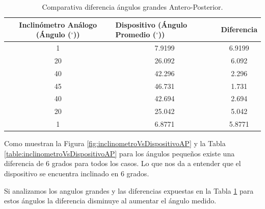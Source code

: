 \documentclass[12pt,a4paper]{article}
\newcommand{\grad}{$^{\circ}$}
\begin{document}
\begin{table}[H]
	\centering
	\caption{Comparativa diferencia ángulos grandes Antero-Posterior.}
	\begin{tabular}{|c|c|c|}
		\hline
		\textbf{Inclinómetro Análogo (Ángulo (\grad))} & \multicolumn{1}{l|}{\textbf{Dispositivo (Ángulo Promedio (\grad))}} & Diferencia 				\\ \hline
		1                                      & 7.9199                                                      & 6.9199                     \\ \hline
		20                                      & 26.092                                                      & 6.092                    \\ \hline
		40                                      & 42.296                                                      & 2.296                     \\ \hline
		45                                      & 46.731                                                      & 1.731                     \\ \hline
		40                                      & 42.694                                                      & 2.694                      \\ \hline
		20                                      & 25.042                                                      & 5.042                     \\ \hline
		1                                      & 6.8771                                                      & 5.8771                     \\ \hline
	\end{tabular}	
	\label{table:inclinometroVsDispositivoAPD}
\end{table}

Como muestran la Figura \ref{fig:inclinometroVsDispositivoAP} y la Tabla \ref{table:inclinometroVsDispositivoAP} para los ángulos pequeños existe una diferencia de 6 grados para todos los casos.
Lo que nos da a entender que el dispositivo se encuentra inclinado en 6 grados.

Si analizamos los angulos grandes y las diferencias expuestas en la Tabla \ref{table:inclinometroVsDispositivoAPD} para estos ángulos la diferencia disminuye al aumentar el ángulo medido.
\end{document}
